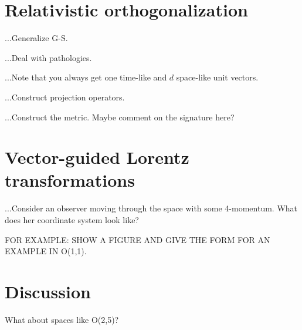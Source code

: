 \documentclass{article}
\begin{document}
\section{Relativistic orthogonalization}

...Generalize G-S.

...Deal with pathologies.

...Note that you always get one time-like and $d$ space-like unit vectors.

...Construct projection operators.

...Construct the metric. Maybe comment on the signature here?

\section{Vector-guided Lorentz transformations}

...Consider an observer moving through the space with some 4-momentum. What does her coordinate system look like?

FOR EXAMPLE: SHOW A FIGURE AND GIVE THE FORM FOR AN EXAMPLE IN O(1,1).

\section{Discussion}

What about spaces like O(2,5)?
\end{document}
